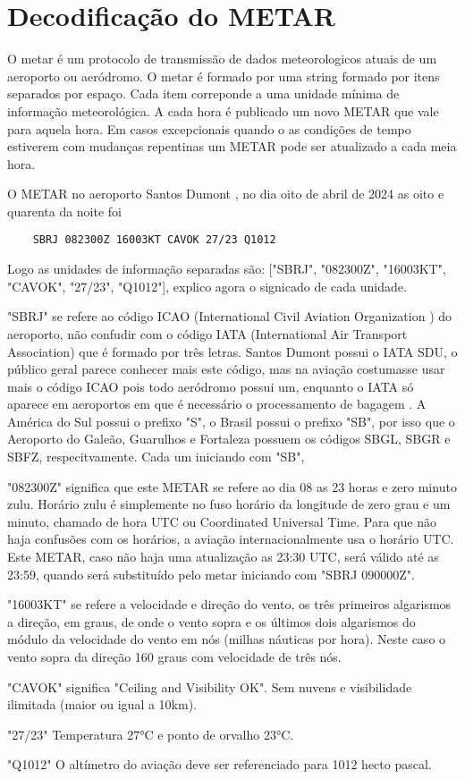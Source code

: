 \chapter{Decodificação do METAR}

O metar é um protocolo de transmissão de dados meteorologicos atuais de um aeroporto ou aeródromo.
O metar é formado por uma string formado por itens separados por espaço. Cada item correponde a uma
unidade mínima de informação meteorológica. A cada hora é publicado
um novo METAR que vale para aquela hora. Em casos excepcionais quando o as condições de tempo 
estiverem com mudanças repentinas um METAR pode ser atualizado a cada meia hora. \cite{metar-speci}

O METAR no aeroporto Santos Dumont \cite{metar-sbrj}, no dia oito de abril de 2024 as oito e quarenta da noite foi
\begin{verbatim}
    SBRJ 082300Z 16003KT CAVOK 27/23 Q1012
\end{verbatim}
Logo as unidades de informação separadas são:
["SBRJ", "082300Z", "16003KT", "CAVOK", "27/23", "Q1012"], explico agora o signicado de cada unidade.

"SBRJ" se refere ao código ICAO (International Civil Aviation Organization ) do aeroporto, não
confudir com o código IATA (International Air Transport Association) que é formado por três letras.
Santos Dumont possui o IATA SDU, o público geral parece conhecer mais este código, mas na aviação
costumasse usar mais o código ICAO pois todo aeródromo possui um, enquanto o IATA só aparece em 
aeroportos em que é necessário o processamento de bagagem \cite{iata-codes} \cite{icao-codes}. 
A América do Sul possui o prefixo "S",
o Brasil possui o prefixo "SB", por isso que o Aeroporto do Galeão, Guarulhos e Fortaleza possuem 
os códigos SBGL, SBGR e SBFZ, respecitvamente. Cada um iniciando com "SB",

"082300Z" significa que este METAR se refere ao dia 08 as 23 horas e zero minuto zulu. Horário
zulu é simplemente no fuso horário da longitude de zero grau e um minuto, chamado de hora UTC ou 
Coordinated Universal Time. Para que não haja confusões com os horários, a aviação internacionalmente
usa o horário UTC. Este METAR, caso não haja uma atualização as 23:30 UTC, será válido até as 23:59,
quando será substituído pelo metar iniciando com "SBRJ 090000Z".

"16003KT" se refere a velocidade e direção do vento, os três primeiros algarismos a direção, em graus,
de onde o vento sopra e os últimos dois algarismos do módulo da velocidade do vento em nós (milhas
náuticas por hora). Neste caso o vento sopra da direção 160 graus com velocidade de três nós.

"CAVOK" significa "Ceiling and Visibility OK". Sem nuvens e visibilidade ilimitada (maior ou igual a
10km).

"27/23" Temperatura 27°C e ponto de orvalho 23°C.

"Q1012" O altímetro do aviação deve ser referenciado para 1012 hecto pascal.